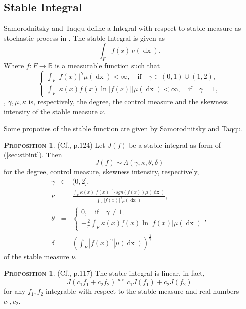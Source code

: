 \documentclass[a4paper, twoside, 11pt]{article}
\theoremstyle{definition}
\newtheorem{proposition}[definition]{\scshape Proposition}
\newcommand{\brkt}[1]{\left({#1} \right)}
\begin{document}
\subsection{Stable Integral}
Samorodnitsky and Taqqu define a Integral with respect to stable measure as stochastic process in \cite{samorodnitsky}. The stable Integral is given as 
\begin{equation}
  \int_F f(x)\, \nu(\mathop{dx}).
  \label{sec:stbint}
\end{equation}
Where $f : F \rightarrow \mathbb{R}$ is a measurable function such that 
\begin{equation}
  \begin{cases} \int_F |f(x)|^\gamma \mu(\mathop{dx}) < \infty,\hspace{1em} \text{if} \hspace{1em} \gamma \in (0, 1) \cup (1, 2),\\
	\int_F |\kappa(x) f(x) \ln|f(x)||\mu(\mathop{dx}) < \infty,\hspace{1em} \text{if} \hspace{1em} \gamma = 1,
  \end{cases}
\end{equation}
, $\gamma, \mu, \kappa$ is, respectively, the degree, the control measure and the skewness intensity of the stable measure $\nu$.

Some propoties of the stable function are given by Samorodnitsky and Taqqu.

\begin{proposition}
  (Cf.\cite{samorodnitsky}, p.124) Let $J(f)$ be a stable integral as form of (\ref{sec:stbint}). Then 
  \begin{equation}
	J(f) \sim \Lambda(\gamma, \kappa, \theta, \delta)
  \end{equation}
for the degree, control measure, skewness intensity, respectively, 
\begin{eqnarray*}
\gamma &\in& (0, 2],\\
\kappa &=& \frac{\int_F \kappa(x) |f(x)|^\gamma\cdot sgn(f(x)) \mu(\mathop{dx})}{\int_F|f(x)|^\gamma\mu(\mathop{dx})},\\
\theta &=&
\begin{cases}
  0 , \hspace{1em} \text{if} \hspace{1em} \gamma \neq 1,\\
  -\frac{2}{\pi}\int_F \kappa(x) f(x) \ln|f(x)|\mu(\mathop{dx})
\end{cases},\\
\delta &=& \brkt{\int_F |f(x)^\gamma|\mu(\mathop{dx})}^{\frac{1}{\gamma}}
\end{eqnarray*}
of the stable measure $\nu$.
\end{proposition}
\begin{proposition}
(Cf.\cite{samorodnitsky}, p.117)  The stable integral is linear, in fact,
\begin{equation}
  J(c_1f_1 + c_2f_2) \overset{a.s.}{=}c_1J(f_1) + c_2J(f_2)
  \label{sec:stblin}
\end{equation}
for any $f_1, f_2$ integrable with respect to the stable measure and real numbers $c_1, c_2$. 
\end{proposition}
\newpage
\end{document}
